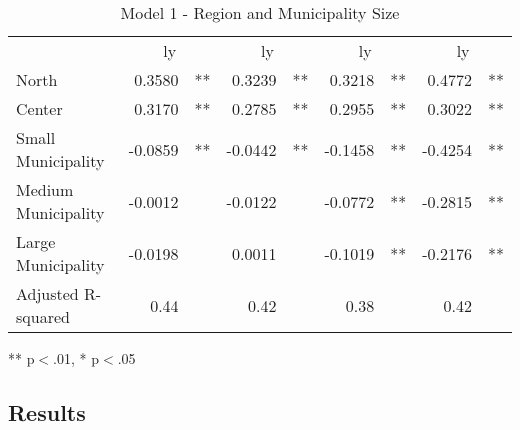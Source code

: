 \documentclass[12pt]{article}
\begin{document}
\begin{spacing}{1.5}
\begin{table}[!h]
\caption{Model 1 - Region and Municipality Size}
\centering
\begin{tabular}{lllllllll}
\cline{1-9}
\multicolumn{1}{r}{} &
  \multicolumn{2}{c}{ly} &
  \multicolumn{2}{c}{ly} &
  \multicolumn{2}{c}{ly} &
  \multicolumn{2}{c}{ly} \\
\cline{1-9}
\multicolumn{1}{l}{North} &
  \multicolumn{1}{r}{0.3580} &
  \multicolumn{1}{l}{**} &
  \multicolumn{1}{r}{0.3239} &
  \multicolumn{1}{l}{**} &
  \multicolumn{1}{r}{0.3218} &
  \multicolumn{1}{l}{**} &
  \multicolumn{1}{r}{0.4772} &
  \multicolumn{1}{l}{**} \\
\multicolumn{1}{l}{Center} &
  \multicolumn{1}{r}{0.3170} &
  \multicolumn{1}{l}{**} &
  \multicolumn{1}{r}{0.2785} &
  \multicolumn{1}{l}{**} &
  \multicolumn{1}{r}{0.2955} &
  \multicolumn{1}{l}{**} &
  \multicolumn{1}{r}{0.3022} &
  \multicolumn{1}{l}{**} \\
\multicolumn{1}{l}{Small Municipality} &
  \multicolumn{1}{r}{-0.0859} &
  \multicolumn{1}{l}{**} &
  \multicolumn{1}{r}{-0.0442} &
  \multicolumn{1}{l}{**} &
  \multicolumn{1}{r}{-0.1458} &
  \multicolumn{1}{l}{**} &
  \multicolumn{1}{r}{-0.4254} &
  \multicolumn{1}{l}{**} \\
\multicolumn{1}{l}{Medium Municipality} &
  \multicolumn{1}{r}{-0.0012} &
  \multicolumn{1}{l}{} &
  \multicolumn{1}{r}{-0.0122} &
  \multicolumn{1}{l}{} &
  \multicolumn{1}{r}{-0.0772} &
  \multicolumn{1}{l}{**} &
  \multicolumn{1}{r}{-0.2815} &
  \multicolumn{1}{l}{**} \\
\multicolumn{1}{l}{Large Municipality} &
  \multicolumn{1}{r}{-0.0198} &
  \multicolumn{1}{l}{} &
  \multicolumn{1}{r}{0.0011} &
  \multicolumn{1}{l}{} &
  \multicolumn{1}{r}{-0.1019} &
  \multicolumn{1}{l}{**} &
  \multicolumn{1}{r}{-0.2176} &
  \multicolumn{1}{l}{**} \\
\multicolumn{1}{l}{Adjusted R-squared} &
  \multicolumn{1}{r}{0.44} &
  \multicolumn{1}{l}{} &
  \multicolumn{1}{r}{0.42} &
  \multicolumn{1}{l}{} &
  \multicolumn{1}{r}{0.38} &
  \multicolumn{1}{l}{} &
  \multicolumn{1}{r}{0.42} &
  \multicolumn{1}{l}{} \\
\cline{1-9}
\end{tabular}

\footnotesize{
** p$<$.01, * p$<$.05
}
\label{table:reg1}
\end{table}

\end{spacing}

\subsection{Results}
\end{document}
